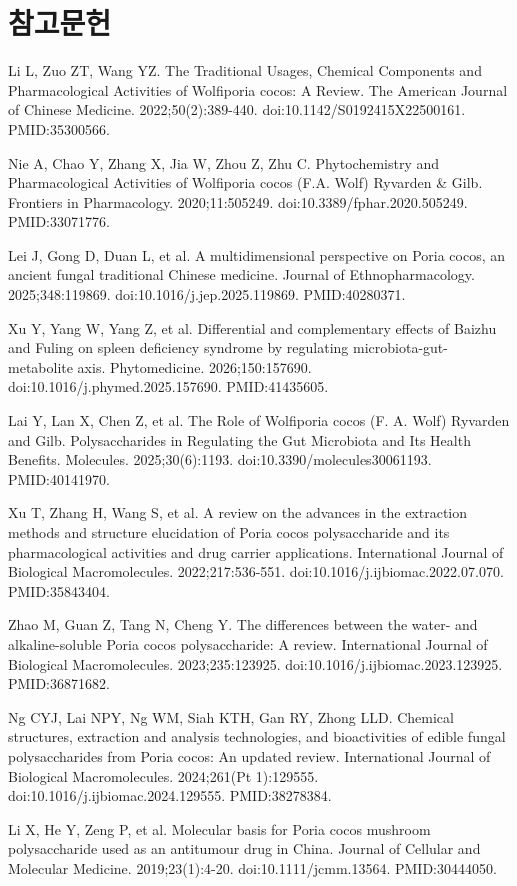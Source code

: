 \documentclass[11pt,oneside]{book}
\newcommand{\refstart}{\par\begingroup\footnotesize\setlength{\parskip}{2.5pt}\raggedright}
\newcommand{\reff}[2]{\par\hangindent=7mm\hangafter=1\noindent[#1]\hspace{2mm}#2\par}
\begin{document}
\section*{참고문헌}
\refstart
\reff{1}{Li L, Zuo ZT, Wang YZ. The Traditional Usages, Chemical Components and Pharmacological Activities of Wolfiporia cocos: A Review. The American Journal of Chinese Medicine. 2022;50(2):389-440. doi:10.1142/S0192415X22500161. PMID:35300566.}
\reff{2}{Nie A, Chao Y, Zhang X, Jia W, Zhou Z, Zhu C. Phytochemistry and Pharmacological Activities of Wolfiporia cocos (F.A. Wolf) Ryvarden \& Gilb. Frontiers in Pharmacology. 2020;11:505249. doi:10.3389/fphar.2020.505249. PMID:33071776.}
\reff{3}{Lei J, Gong D, Duan L, et al. A multidimensional perspective on Poria cocos, an ancient fungal traditional Chinese medicine. Journal of Ethnopharmacology. 2025;348:119869. doi:10.1016/j.jep.2025.119869. PMID:40280371.}
\reff{4}{Xu Y, Yang W, Yang Z, et al. Differential and complementary effects of Baizhu and Fuling on spleen deficiency syndrome by regulating microbiota-gut-metabolite axis. Phytomedicine. 2026;150:157690. doi:10.1016/j.phymed.2025.157690. PMID:41435605.}
\reff{5}{Lai Y, Lan X, Chen Z, et al. The Role of Wolfiporia cocos (F. A. Wolf) Ryvarden and Gilb. Polysaccharides in Regulating the Gut Microbiota and Its Health Benefits. Molecules. 2025;30(6):1193. doi:10.3390/molecules30061193. PMID:40141970.}
\reff{6}{Xu T, Zhang H, Wang S, et al. A review on the advances in the extraction methods and structure elucidation of Poria cocos polysaccharide and its pharmacological activities and drug carrier applications. International Journal of Biological Macromolecules. 2022;217:536-551. doi:10.1016/j.ijbiomac.2022.07.070. PMID:35843404.}
\reff{7}{Zhao M, Guan Z, Tang N, Cheng Y. The differences between the water- and alkaline-soluble Poria cocos polysaccharide: A review. International Journal of Biological Macromolecules. 2023;235:123925. doi:10.1016/j.ijbiomac.2023.123925. PMID:36871682.}
\reff{8}{Ng CYJ, Lai NPY, Ng WM, Siah KTH, Gan RY, Zhong LLD. Chemical structures, extraction and analysis technologies, and bioactivities of edible fungal polysaccharides from Poria cocos: An updated review. International Journal of Biological Macromolecules. 2024;261(Pt 1):129555. doi:10.1016/j.ijbiomac.2024.129555. PMID:38278384.}
\reff{9}{Li X, He Y, Zeng P, et al. Molecular basis for Poria cocos mushroom polysaccharide used as an antitumour drug in China. Journal of Cellular and Molecular Medicine. 2019;23(1):4-20. doi:10.1111/jcmm.13564. PMID:30444050.}
\end{document}
